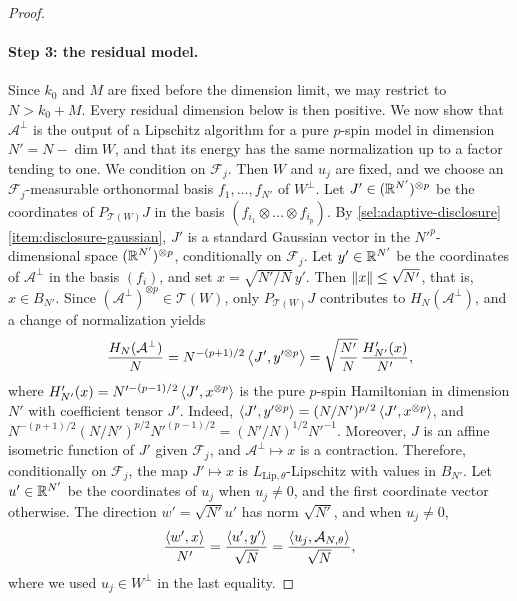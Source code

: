 \begin{proof}
\paragraph{Step 3: the residual model.}
Since $k_0$ and $M$ are fixed before the dimension limit, we may restrict
to $N>k_0+M$. Every residual dimension below is then positive.
We now show that $\mathcal A^\perp$ is the output of a Lipschitz algorithm
for a pure $p$-spin model in dimension $N'=N-\dim W$, and that its
energy has the same normalization up to a factor tending to one. We
condition on $\mathcal F_j$. Then $W$ and $u_j$ are fixed, and we choose an
$\mathcal F_j$-measurable orthonormal basis $f_1,\dots,f_{N'}$ of
$W^\perp$. Let $J'\in(\mathbb R^{N'})^{\otimes p}$ be the coordinates of
$P_{\mathcal T(W)}J$ in the basis
$(f_{i_1}\otimes\dots\otimes f_{i_p})$. By
\cref{sel:adaptive-disclosure}\ref{item:disclosure-gaussian}, $J'$ is a
standard Gaussian vector in the $N'^p$-dimensional space
$(\mathbb R^{N'})^{\otimes p}$, conditionally on $\mathcal F_j$. Let
$y'\in\mathbb R^{N'}$ be the coordinates of $\mathcal A^\perp$ in the basis
$(f_i)$, and set $x=\sqrt{N'/N}\,y'$. Then $\lVert x\rVert\le\sqrt{N'}$, that is,
$x\in B_{N'}$. Since $(\mathcal A^\perp)^{\otimes p}\in\mathcal T(W)$, only
$P_{\mathcal T(W)}J$ contributes to $H_N(\mathcal A^\perp)$, and a change of
normalization yields
\begin{equation}\label{sel:residual-normalization}
 \frac{H_N(\mathcal A^\perp)}N
 =N^{-(p+1)/2}\left\langle J',y'^{\otimes p}\right\rangle
 =\sqrt{\frac{N'}N}\,\frac{H'_{N'}(x)}{N'},
\end{equation}
where $H'_{N'}(x)=N'^{-(p-1)/2}\left\langle J',x^{\otimes p}\right\rangle$ is the pure $p$-spin
Hamiltonian in dimension $N'$ with coefficient tensor $J'$. Indeed,
$\left\langle J',y'^{\otimes p}\right\rangle=(N/N')^{p/2}\left\langle J',x^{\otimes p}\right\rangle$, and
$N^{-(p+1)/2}(N/N')^{p/2}N'^{(p-1)/2}=(N'/N)^{1/2}N'^{-1}$. Moreover, $J$
is an affine isometric function of $J'$ given $\mathcal F_j$, and
$\mathcal A^\perp\mapsto x$ is a contraction. Therefore, conditionally on $\mathcal F_j$, the map $J'\mapsto x$ is $L_{\mathrm{Lip},\theta}$-Lipschitz with
values in $B_{N'}$. Let $u'\in\mathbb R^{N'}$ be the coordinates of $u_j$ when
$u_j\ne0$, and the first coordinate vector otherwise. The direction
$w'=\sqrt{N'}u'$ has norm $\sqrt{N'}$, and when $u_j\ne0$,
\[
 \frac{\left\langle w',x\right\rangle}{N'}=\frac{\left\langle u',y'\right\rangle}{\sqrt N}
 =\frac{\left\langle u_j,\mathcal A_{N,\theta}\right\rangle}{\sqrt N},
\]
where we used $u_j\in W^\perp$ in the last equality.


\end{proof}
